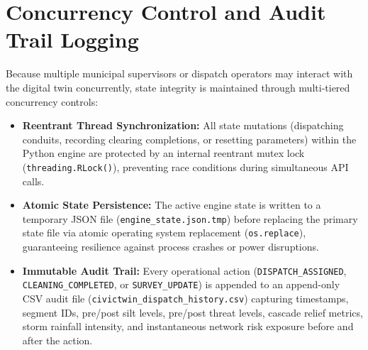 \section{Concurrency Control and Audit Trail Logging}
Because multiple municipal supervisors or dispatch operators may interact with the digital twin concurrently, state integrity is maintained through multi-tiered concurrency controls:
\begin{itemize}
    \item \textbf{Reentrant Thread Synchronization:} All state mutations (dispatching conduits, recording clearing completions, or resetting parameters) within the Python engine are protected by an internal reentrant mutex lock (\texttt{threading.RLock()}), preventing race conditions during simultaneous API calls.
    \item \textbf{Atomic State Persistence:} The active engine state is written to a temporary JSON file (\texttt{engine\_state.json.tmp}) before replacing the primary state file via atomic operating system replacement (\texttt{os.replace}), guaranteeing resilience against process crashes or power disruptions.
    \item \textbf{Immutable Audit Trail:} Every operational action (\texttt{DISPATCH\_ASSIGNED}, \texttt{CLEANING\_COMPLETED}, or \texttt{SURVEY\_UPDATE}) is appended to an append-only CSV audit file (\texttt{civictwin\_dispatch\_history.csv}) capturing timestamps, segment IDs, pre/post silt levels, pre/post threat levels, cascade relief metrics, storm rainfall intensity, and instantaneous network risk exposure before and after the action.
\end{itemize}
